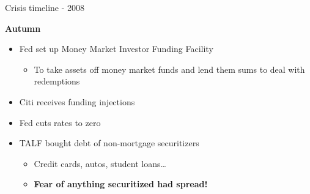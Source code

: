 \begin{frame}{Crisis timeline - 2008}

\textbf{Autumn}
	\begin{itemize}
	\item	Fed set up Money Market Investor Funding Facility
		\begin{itemize}
		\item	To take assets off money market funds and lend them sums to deal with redemptions
		\end{itemize}
	\vspace{2mm}
	\item	Citi receives funding injections
	\vspace{2mm}
	\item	Fed cuts rates to zero
	\vspace{2mm}
	\item	TALF bought debt of non-mortgage securitizers
		\begin{itemize}
		\item	Credit cards, autos, student loans\ldots
		\item	\textbf{Fear of anything securitized had spread!}
		\end{itemize}
	\end{itemize}

\end{frame}



